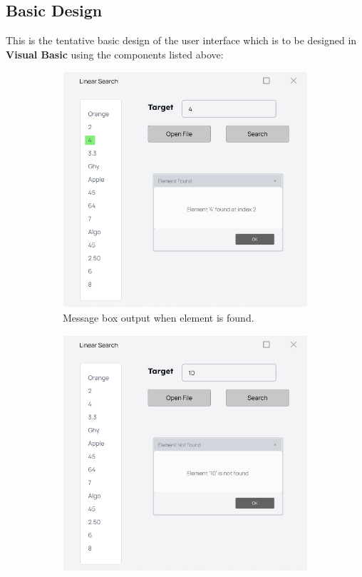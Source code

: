 \documentclass[12pt,a4paper]{article}
\begin{document}
    \subsection{Basic Design}
    This is the tentative basic design of the user interface which is to be designed in \textbf{Visual Basic} using the components listed above:
    \begin{figure}[h]
        \centering
        \begin{subfigure}[b]{0.45\linewidth}
            \includegraphics[width=\linewidth]{Prototype.png} 
            \caption{Message box output when element is found.}
            \label{fig:sub1}
        \end{subfigure}
        \hfill
        \begin{subfigure}[b]{0.45\linewidth}
            \includegraphics[width=\linewidth]{Prototype-2.png}

\end{subfigure}
\end{figure}
\end{document}
